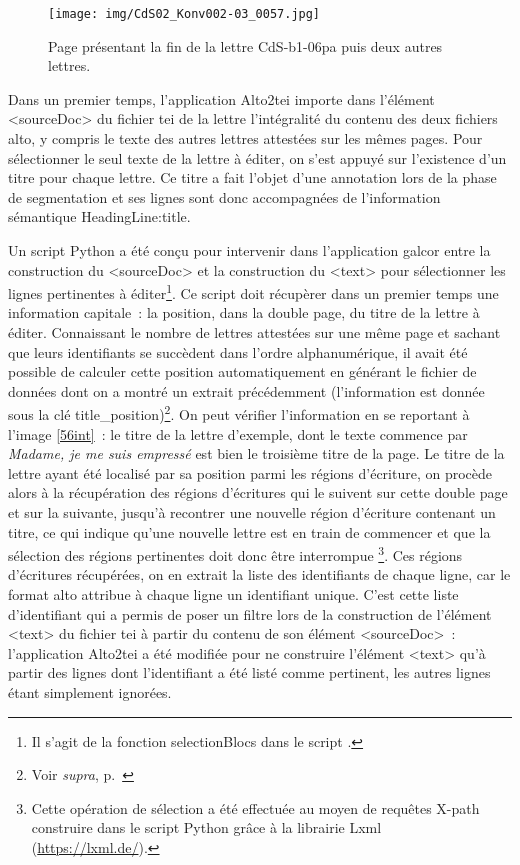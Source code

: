 \documentclass[a4paper,12pt,twoside]{book}
\begin{document}
			\begin{figure}[!h]
				\centering
				\texttt{[image: img/CdS02\_Konv002-03\_0057.jpg]}
				\caption{Page présentant la fin de la lettre \textsf{CdS-b1-06pa} puis deux autres lettres.}
				\label{57int}
			\end{figure}
		
			Dans un premier temps, l'application Alto2tei importe dans l'élément \textsf{<sourceDoc>} du fichier \gls{tei} de la lettre l'intégralité du contenu des deux fichiers \gls{alto}, y compris le texte des autres lettres attestées sur les mêmes pages. Pour sélectionner le seul texte de la lettre à éditer, on s'est appuyé sur l'existence d'un titre pour chaque lettre. Ce titre a fait l'objet d'une annotation lors de la phase de {segmentation} et ses lignes sont donc accompagnées de l'information sémantique \textsf{HeadingLine:title}.
			
			Un script Python a été conçu pour intervenir dans l'application \gls{galcor} entre la construction du \textsf{<sourceDoc>} et la construction du \textsf{<text>} pour sélectionner les lignes pertinentes à éditer\footnote{Il s'agit de la fonction \textsf{selectionBlocs} dans le script \cite{biayCdsFonctionsPy2022}.}. Ce script doit récupèrer dans un premier temps une information capitale~: la position, dans la double page, du titre de la lettre à éditer. Connaissant le nombre de lettres attestées sur une même page et sachant que leurs identifiants se succèdent dans l'ordre alphanumérique, il avait été possible de calculer cette position automatiquement en générant le fichier de données dont on a montré un extrait précédemment (l'information est donnée sous la clé \textsf{title\_position})\footnote{Voir \textit{supra}, p.~\pageref{json-CdS-b1-06pa}}. On peut vérifier l'information en se reportant à l'image \ref{56int}~: le titre de la lettre d'exemple, dont le texte commence par \textit{Madame, je me suis empressé} est bien le troisième titre de la page. Le titre de la lettre ayant été localisé par sa position parmi les régions d'écriture, on procède alors à la récupération des régions d'écritures qui le suivent sur cette double page et sur la suivante, jusqu'à recontrer une nouvelle région d'écriture contenant un titre, ce qui indique qu'une nouvelle lettre est en train de commencer et que la sélection des régions pertinentes doit donc être interrompue
			\footnote{Cette opération de sélection a été effectuée au moyen de requêtes X-path construire dans le script Python grâce à la librairie Lxml (\url{https://lxml.de/}).}. Ces régions d'écritures récupérées, on en extrait la liste des identifiants de chaque ligne, car le format \gls{alto} attribue à chaque ligne un identifiant unique. C'est cette liste d'identifiant qui a permis de poser un filtre lors de la construction de l'élément \textsf{<text>} du fichier \gls{tei} à partir du contenu de son élément \textsf{<sourceDoc>}~: l'application Alto2tei a été modifiée pour ne construire l'élément \textsf{<text>} qu'à partir des lignes dont l'identifiant a été listé comme pertinent, les autres lignes étant simplement ignorées.
			
\end{document}
